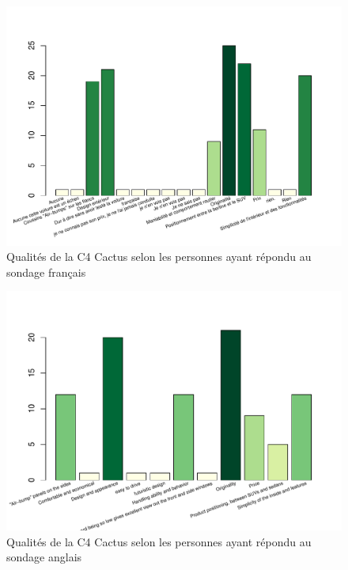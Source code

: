 \documentclass[12pt]{article}\usepackage[]{graphicx}\usepackage[]{color}
\makeatletter
\def\maxwidth{ %
  \ifdim\Gin@nat@width>\linewidth
    \linewidth
  \else
    \Gin@nat@width
  \fi
}
\newenvironment{knitrout}{}{} %
\makeatother
\begin{document}
\begin{knitrout}
\color{fgcolor}\begin{figure}[H]
\includegraphics[width=\maxwidth]{figure/qualities_fr-1} \caption[Qualités de la C4 Cactus selon les personnes ayant répondu au sondage français]{Qualités de la C4 Cactus selon les personnes ayant répondu au sondage français}\label{fig:qualities fr}
\end{figure}


\end{knitrout}

\begin{knitrout}
\color{fgcolor}\begin{figure}[H]
\includegraphics[width=\maxwidth]{figure/qualities_en-1} \caption[Qualités de la C4 Cactus selon les personnes ayant répondu au sondage anglais]{Qualités de la C4 Cactus selon les personnes ayant répondu au sondage anglais}\label{fig:qualities en}
\end{figure}


\end{knitrout}
\end{document}
